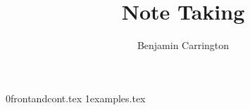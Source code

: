 \documentclass[a4paper,11pt]{article}
\author{Benjamin Carrington}
\title{\textbf{Note Taking}}
\date{}
\begin{document}
	{0frontandcont.tex} \pagebreak
	{1examples.tex} \pagebreak
\end{document}
